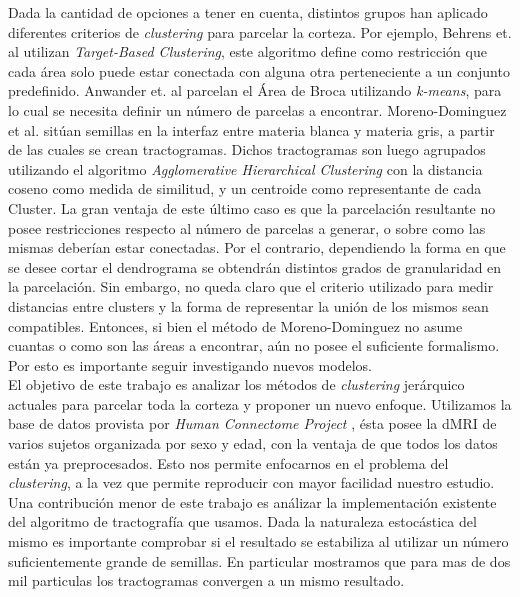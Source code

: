 Dada la cantidad de opciones a tener en cuenta, distintos grupos han aplicado
diferentes criterios de \textit{clustering} para parcelar la corteza. Por ejemplo,
Behrens et. al \cite{Behrens2003} utilizan \textit{Target-Based Clustering}, este
algoritmo define como restricci\'on que cada \'area solo puede estar conectada con
alguna otra perteneciente a un conjunto predefinido. Anwander et. al \cite{Anwander2006} 
parcelan el \'Area de Broca utilizando \textit{k-means}, para lo cual se necesita
definir un n\'umero de parcelas a encontrar. Moreno-Dominguez et al. 
\cite{Moreno-Dominguez2014} sit\'uan semillas en la interfaz entre materia blanca
y materia gris, a partir de las cuales se crean tractogramas. Dichos tractogramas
son luego agrupados utilizando el algoritmo \textit{Agglomerative Hierarchical
Clustering} con la distancia coseno como medida de similitud, y un centroide como
representante de cada Cluster. La gran ventaja de este \'ultimo caso es que la
parcelaci\'on resultante no posee restricciones respecto al n\'umero de parcelas
a generar, o sobre como las mismas deber\'ian estar conectadas. Por el contrario,
dependiendo la forma en que se desee cortar el dendrograma se obtendr\'an
distintos grados de granularidad en la parcelaci\'on. Sin embargo, no queda claro
que el criterio utilizado para medir distancias entre clusters y la forma de
representar la uni\'on de los mismos sean compatibles. Entonces, si bien el
m\'etodo de Moreno-Dominguez no asume cuantas o como son las \'areas a encontrar,
a\'un no posee el suficiente formalismo. Por esto es importante seguir investigando
nuevos modelos.  \\

El objetivo de este trabajo es analizar los m\'etodos de \textit{clustering} 
jer\'arquico actuales para parcelar toda la corteza y proponer un nuevo enfoque. 
Utilizamos la base de datos provista por \textit{Human Connectome Project} 
\cite{VanEssen2012}, \'esta posee la dMRI de varios sujetos organizada por sexo 
y edad, con la ventaja de que todos los datos est\'an ya preprocesados. Esto nos
permite enfocarnos en el problema del \textit{clustering}, a la vez que permite
reproducir con mayor facilidad nuestro estudio. \\

Una contribuci\'on menor de este trabajo es an\'alizar la implementaci\'on 
existente del algoritmo de tractograf\'ia que usamos. Dada la naturaleza
estoc\'astica del mismo es importante comprobar si el resultado se estabiliza
al utilizar un n\'umero suficientemente grande de semillas. En particular
mostramos que para mas de dos mil particulas los tractogramas convergen a un
mismo resultado. \\

